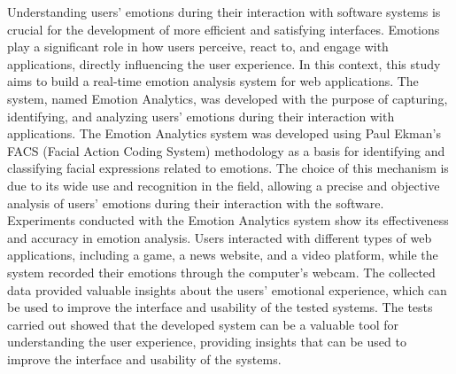 \begin{resumo-ingles}

  Understanding users' emotions during their interaction with software systems is crucial for the development of more efficient and satisfying interfaces. Emotions play a significant role in how users perceive, react to, and engage with applications, directly influencing the user experience. In this context, this study aims to build a real-time emotion analysis system for web applications. The system, named Emotion Analytics, was developed with the purpose of capturing, identifying, and analyzing users' emotions during their interaction with applications. The Emotion Analytics system was developed using Paul Ekman's FACS (Facial Action Coding System) methodology as a basis for identifying and classifying facial expressions related to emotions. The choice of this mechanism is due to its wide use and recognition in the field, allowing a precise and objective analysis of users' emotions during their interaction with the software. Experiments conducted with the Emotion Analytics system show its effectiveness and accuracy in emotion analysis. Users interacted with different types of web applications, including a game, a news website, and a video platform, while the system recorded their emotions through the computer's webcam. The collected data provided valuable insights about the users' emotional experience, which can be used to improve the interface and usability of the tested systems. The tests carried out showed that the developed system can be a valuable tool for understanding the user experience, providing insights that can be used to improve the interface and usability of the systems.


\end{resumo-ingles}
